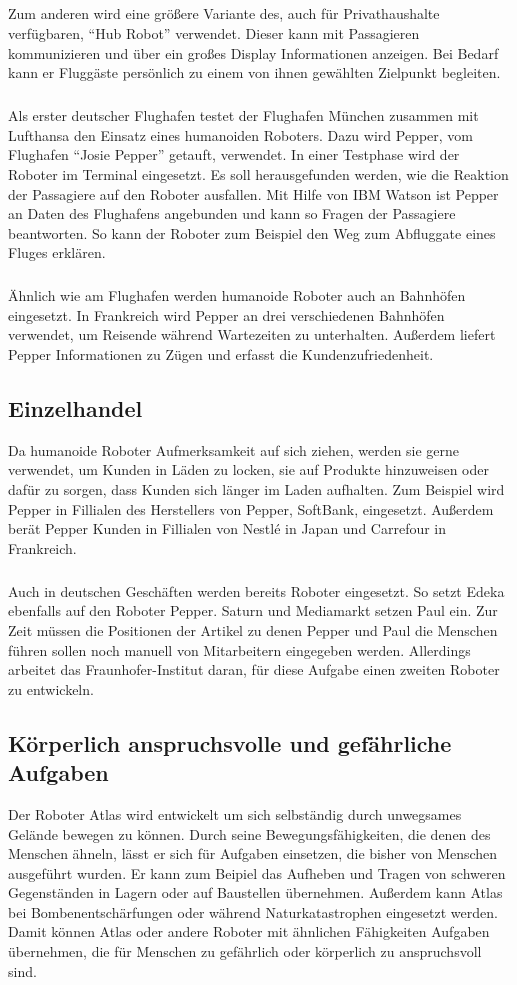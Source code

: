\subparagraph{}
Zum anderen wird eine größere Variante des, auch für Privathaushalte
verfügbaren, "`Hub Robot"' verwendet. Dieser kann mit Passagieren kommunizieren
und über ein großes Display Informationen anzeigen. Bei Bedarf kann er Fluggäste
persönlich zu einem von ihnen gewählten Zielpunkt begleiten.
\cite{Beineke2017}

\subparagraph{}
Als erster deutscher Flughafen testet der Flughafen München zusammen mit
Lufthansa den Einsatz eines humanoiden Roboters. Dazu wird Pepper, vom Flughafen
"`Josie Pepper"' getauft, verwendet. In einer Testphase wird der Roboter im
Terminal eingesetzt. Es soll herausgefunden werden, wie die Reaktion der
Passagiere auf den Roboter ausfallen. Mit Hilfe von IBM Watson ist Pepper an
Daten des Flughafens angebunden und kann so Fragen der Passagiere beantworten.
So kann der Roboter zum Beispiel den Weg zum Abfluggate eines Fluges erklären.
\cite{MunichAirport2018}

\subparagraph{}
Ähnlich wie am Flughafen werden humanoide Roboter auch an Bahnhöfen eingesetzt.
In Frankreich wird Pepper an drei verschiedenen Bahnhöfen verwendet, um Reisende
während Wartezeiten zu unterhalten. Außerdem liefert Pepper Informationen zu
Zügen und erfasst die Kundenzufriedenheit. \cite{SoftBankIV2018}

\subsection{Einzelhandel}
Da humanoide Roboter Aufmerksamkeit auf sich ziehen, werden sie gerne verwendet,
um Kunden in Läden zu locken, sie auf Produkte hinzuweisen oder dafür zu sorgen,
dass Kunden sich länger im Laden aufhalten. Zum Beispiel wird Pepper in
Fillialen des Herstellers von Pepper, SoftBank, eingesetzt. Außerdem berät
Pepper Kunden in Fillialen von Nestlé in Japan und Carrefour in Frankreich.
\cite{SoftBankIV2018}

\subparagraph{}
Auch in deutschen Geschäften werden bereits Roboter
eingesetzt. So setzt Edeka ebenfalls auf den Roboter Pepper. Saturn und
Mediamarkt setzen Paul ein. Zur Zeit
müssen die Positionen der Artikel zu denen Pepper und Paul die Menschen führen
sollen noch manuell von Mitarbeitern eingegeben werden. Allerdings arbeitet das
Fraunhofer-Institut daran, für diese Aufgabe einen zweiten Roboter zu
entwickeln. \cite{Hildebrand2017}

\subsection{Körperlich anspruchsvolle und gefährliche Aufgaben}
Der Roboter Atlas wird entwickelt um sich selbständig durch unwegsames Gelände
bewegen zu können. Durch seine Bewegungsfähigkeiten, die denen des Menschen
ähneln, lässt er sich für Aufgaben einsetzen, die bisher von Menschen ausgeführt
wurden. Er kann zum Beipiel das Aufheben
und Tragen von schweren Gegenständen in Lagern oder auf Baustellen übernehmen.
Außerdem kann Atlas bei Bombenentschärfungen oder während Naturkatastrophen
eingesetzt werden. Damit können Atlas oder andere Roboter mit ähnlichen
Fähigkeiten Aufgaben übernehmen, die für Menschen zu gefährlich oder körperlich
zu anspruchsvoll sind. \cite{Kaczmarek2016}

